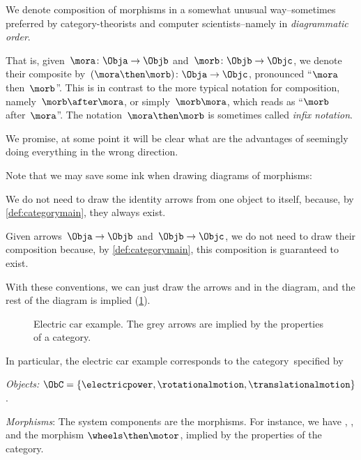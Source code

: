 
\begin{remark}
    We denote composition of morphisms in a somewhat unusual way--sometimes preferred by category-theorists and computer scientists--namely in \emph{diagrammatic order}.

    That is, given~$\mora \colon \Obja\to \Objb$ and~$\morb \colon \Objb \to \Objc$, we denote their composite by~$(\mora\then \morb)\colon \Obja\to \Objc$, pronounced ``$\mora$ then~$\morb$''. This is in contrast to the more typical notation for composition, namely~$\morb\after \mora$, or simply~$\morb \mora$, which reads as ``$\morb$ after~$\mora$''. The notation~$\mora \then \morb$ is sometimes called \emph{infix notation}.

    We promise, at some point it will be clear what are the advantages of seemingly doing everything
    in the wrong direction.
\end{remark}

Note that we may save some ink when drawing diagrams of morphisms:
\begin{compactitem}
    \item We do not need to draw the identity arrows from one object to itself, because, by \cref{def:categorymain}, they always exist.
    \item  Given arrows~$\Obja \to \Objb$ and~$\Objb \to \Objc$, we do not need to draw their composition because, by \cref{def:categorymain}, this composition is guaranteed to exist.
\end{compactitem}

With these conventions, we can just draw the arrows \motor and \wheels in the diagram, and the rest of the diagram is implied (\cref{fig:e5}).

\begin{figure}[h!]
    \centering
    \caption{Electric car example. The grey arrows are implied by the properties
    of a category.\label{fig:e5}}
\end{figure}

In particular, the electric car example corresponds to the category~\CatC specified by
\begin{compactitem}
    \item \emph{Objects:} $\ObC=\{\electricpower,\rotationalmotion,\translationalmotion\}$.
    \item \emph{Morphisms}: The system components are the morphisms. For instance, we have \motor, \wheels, and the morphism $\wheels \then \motor$, implied by the properties of the category.
\end{compactitem}

